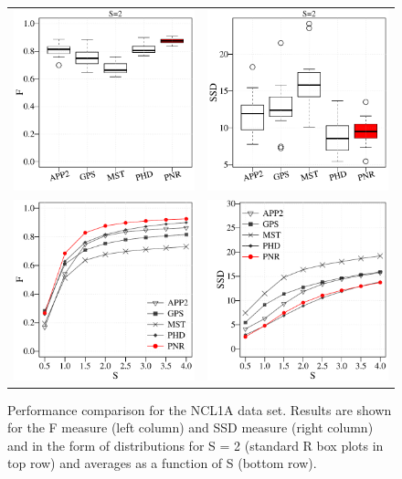 \begin{figure}
	\centering
	\begin{tabular}{cc}
		\includegraphics[width=0.35\columnwidth]{fig15a} &
		\includegraphics[width=0.35\columnwidth]{fig15b} \\%
		\includegraphics[width=0.35\columnwidth]{fig15c} &
		\includegraphics[width=0.35\columnwidth]{fig15d}
	\end{tabular}
	\caption{Performance comparison for the NCL1A data set. Results are shown for the F measure (left column) and SSD measure (right column) and in the form of distributions for S = 2 (standard R box plots in top row) and averages as a function of S (bottom row).}
	\label{fig15}
\end{figure}

